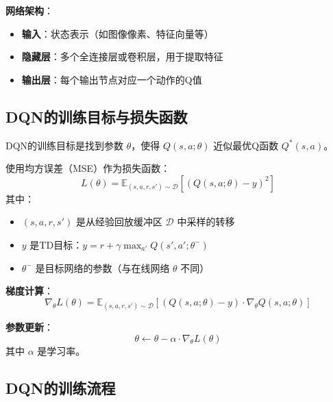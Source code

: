 \textbf{网络架构}：
\begin{itemize}
    \item \textbf{输入}：状态表示（如图像像素、特征向量等）
    \item \textbf{隐藏层}：多个全连接层或卷积层，用于提取特征
    \item \textbf{输出层}：每个输出节点对应一个动作的Q值
\end{itemize}

\subsection{DQN的训练目标与损失函数}

DQN的训练目标是找到参数 $\theta$，使得 $Q(s, a; \theta)$ 近似最优Q函数 $Q^*(s, a)$。

\begin{definition}[DQN损失函数]
使用均方误差（MSE）作为损失函数：
\[
L(\theta) = \mathbb{E}_{(s,a,r,s') \sim \mathcal{D}} \left[ \left( Q(s, a; \theta) - y \right)^2 \right]
\]
其中：
\begin{itemize}
    \item $(s, a, r, s')$ 是从经验回放缓冲区 $\mathcal{D}$ 中采样的转移
    \item $y$ 是TD目标：$y = r + \gamma \max_{a'} Q(s', a'; \theta^-)$
    \item $\theta^-$ 是目标网络的参数（与在线网络 $\theta$ 不同）
\end{itemize}
\end{definition}

\textbf{梯度计算}：
\[
\nabla_{\theta} L(\theta) = \mathbb{E}_{(s,a,r,s') \sim \mathcal{D}} \left[ \left( Q(s, a; \theta) - y \right) \cdot \nabla_{\theta} Q(s, a; \theta) \right]
\]

\textbf{参数更新}：
\[
\theta \leftarrow \theta - \alpha \cdot \nabla_{\theta} L(\theta)
\]
其中 $\alpha$ 是学习率。

\subsection{DQN的训练流程}

